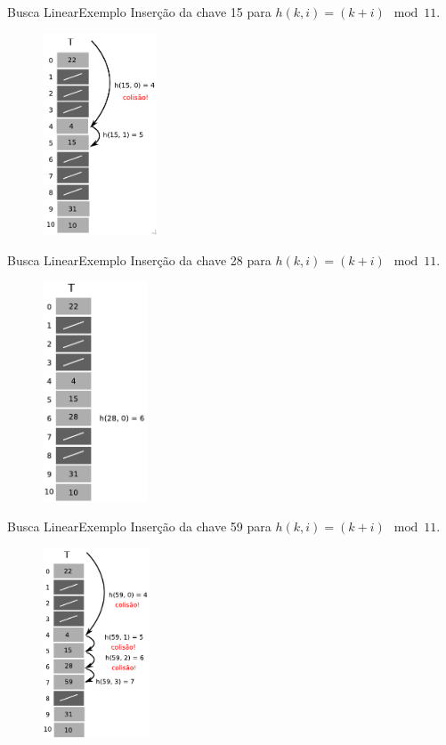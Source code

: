 \documentclass[aspectratio=169]{beamer}
\begin{document}
\begin{frame}{Busca Linear}{Exemplo}
Inserção da chave 15 para $h(k, i) = (k + i) \mod 11$.
\begin{figure}[!h]
  \centering
  \includegraphics[width=96pt]{imagens/ex_enderecamento_aberto6.png}
  \label{fig_ex_enderecamento_aberto6}
\end{figure}
\end{frame}


\begin{frame}{Busca Linear}{Exemplo}
Inserção da chave 28 para $h(k, i) = (k + i) \mod 11$.
\begin{figure}[!h]
  \centering
  \includegraphics[width=88pt]{imagens/ex_enderecamento_aberto7.png}
  \label{fig_ex_enderecamento_aberto7}
\end{figure}
\end{frame}


\begin{frame}{Busca Linear}{Exemplo}
Inserção da chave 59 para $h(k, i) = (k + i) \mod 11$.
\begin{figure}[!h]
  \centering
  \includegraphics[width=90pt]{imagens/ex_enderecamento_aberto8.png}
  \label{fig_ex_enderecamento_aberto8}
\end{figure}
\end{frame}
\end{document}
